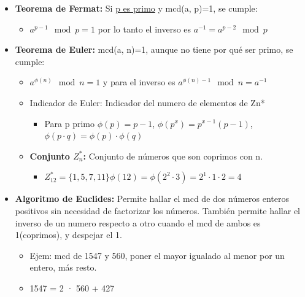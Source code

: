 \documentclass[12pt, twoside, openright]{report} %
\begin{document}
  \begin{itemize}
  \item \textbf{Teorema de Fermat:} Si \underline{p es primo} y mcd(a, p)=1,
    se cumple:
    

    \begin{itemize}
    \item $a^{p-1} \mod p = 1$ por lo tanto el inverso es $a^{-1} = a^{p-2} \mod p$
      
    \end{itemize}
  \item \textbf{Teorema de Euler:} mcd(a, n)=1, aunque no tiene por qué ser
    primo, se cumple:
    

    \begin{itemize}
    \item $a^{\phi(n)} \mod n = 1$ y para el inverso es $a^{\phi(n)-1} \mod n = a^{-1}$
      
    \item Indicador de Euler: Indicador del numero de elementos de Zn*
    \begin{itemize}
		\item Para p primo $\phi(p)=p-1$, $\phi(p^x)=p^{x-1}(p-1)$, $\phi(p\cdot q) = \phi(p)\cdot\phi(q)$
	\end{itemize}
      
    \item \textbf{Conjunto $Z_n^*$:} Conjunto de números que son coprimos con n.
      

      \begin{itemize}
      \item
        
		$Z_{1 2}^* = \{ 1, 5, 7, 11\} \phi(12) = \phi(2^2\cdot 3)=2^1 \cdot 1 \cdot 2 = 4$
        
      \end{itemize}
    \end{itemize}
  \item \textbf{Algoritmo de Euclides:} Permite hallar el mcd de dos números
    enteros positivos sin necesidad de factorizar los números. También
    permite hallar el inverso de un numero respecto a otro cuando el mcd
    de ambos es 1(coprimos), y despejar el 1.
    

    \begin{itemize}
    \item Ejem: mcd de 1547 y 560, poner el mayor igualado al menor por un
      entero, más resto.
      
    \item 1547 = 2 · 560 + 427
      

\end{itemize}
\end{itemize}
\end{document}
